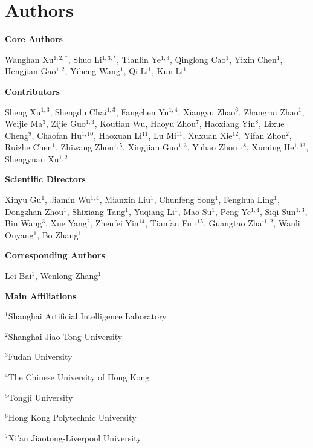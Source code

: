 \renewcommand{\thesection}{\Alph{section}}
\renewcommand{\thesubsection}{\Alph{section}.\arabic{subsection}}
\renewcommand{\thesubsubsection}{\Alph{section}.\arabic{subsection}.\arabic{subsubsection}}

\section{Authors}

\begin{flushleft}

\textbf{Core Authors}

Wanghan Xu$^{1,2,*}$,
Shuo Li$^{1,3,*}$,
Tianlin Ye$^{1,3}$,
Qinglong Cao$^{1}$,
Yixin Chen$^{1}$,
Hengjian Gao$^{1,2}$,
Yiheng Wang$^{1}$,
Qi Li$^{1}$,
Kun Li$^{1}$

\textbf{Contributors}

Sheng Xu$^{1,3}$,
Shengdu Chai$^{1,3}$,
Fangchen Yu$^{1,4}$,
Xiangyu Zhao$^{6}$,
Zhangrui Zhao$^{1}$,
Weijie Ma$^{3}$,
Zijie Guo$^{1,3}$,
Koutian Wu,
Haoyu Zhou$^{7}$,
Haoxiang Yin$^{8}$,
Lixue Cheng$^{9}$,
Chaofan Hu$^{1,10}$,
Haoxuan Li$^{11}$,
Lu Mi$^{11}$,
Xuxuan Xie$^{12}$,
Yifan Zhou$^{2}$,
Ruizhe Chen$^{1}$,
Zhiwang Zhou$^{1,5}$,
Xingjian Guo$^{1,3}$,
Yuhao Zhou$^{1,8}$,
Xuming He$^{1,13}$,
Shengyuan Xu$^{1,2}$

\textbf{Scientific Directors}

Xinyu Gu$^{1}$,
Jiamin Wu$^{1,4}$,
Mianxin Liu$^{1}$,
Chunfeng Song$^{1}$,
Fenghua Ling$^{1}$,
Dongzhan Zhou$^{1}$,
Shixiang Tang$^{1}$,
Yuqiang Li$^{1}$,
Mao Su$^{1}$,
Peng Ye$^{1,4}$,
Siqi Sun$^{1,3}$,
Bin Wang$^{3}$,
Xue Yang$^{2}$,
Zhenfei Yin$^{14}$,
Tianfan Fu$^{1,15}$,
Guangtao Zhai$^{1,2}$,
Wanli Ouyang$^{1}$,
Bo Zhang$^{1}$

\textbf{Corresponding Authors}

Lei Bai$^{1}$,
Wenlong Zhang$^{1}$

\vspace{\baselineskip}

\textbf{Main Affiliations}

$^{1}$Shanghai Artificial Intelligence Laboratory

$^{2}$Shanghai Jiao Tong University

$^{3}$Fudan University

$^{4}$The Chinese University of Hong Kong

$^{5}$Tongji University

$^{6}$Hong Kong Polytechnic University

$^{7}$Xi'an Jiaotong-Liverpool University


\end{flushleft}
